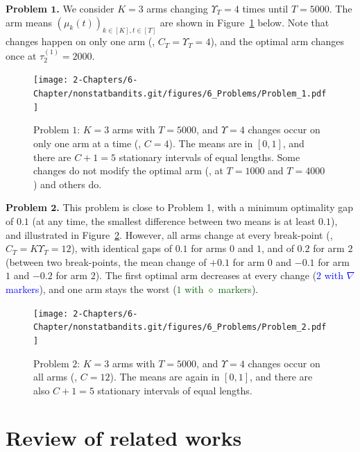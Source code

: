\textbf{Problem $\bm 1$.}
We consider $K=3$ arms changing $\Upsilon_T=4$ times until $T=5000$.
The arm means $(\mu_k(t))_{k\in[K],t\in[T]}$ are shown in Figure~\ref{fig:6:Problem_1} below.
Note that changes happen on only one arm (\ie, $C_T=\Upsilon_T=4$),
and the optimal arm changes once at $\tau_2^{(1)}=2000$.

\begin{figure}[h!]  %
    \centering
    \texttt{[image: 2-Chapters/6-Chapter/nonstatbandits.git/figures/6\_Problems/Problem\_1.pdf]}
    \caption{Problem $1$: $K=3$ arms with $T=5000$, and $\Upsilon=4$ changes occur on only one arm at a time (\ie, $C=4$).
        The means are in $[0,1]$, and there are $C+1=5$ stationary intervals of equal lengths.
        Some changes do not modify the optimal arm (\eg, at $T=1000$ and $T=4000$) and others do.
    }
    \label{fig:6:Problem_1}
\end{figure}


\textbf{Problem $\bm 2$.}
This problem is close to Problem 1, with a minimum optimality gap of $0.1$ (at any time, the smallest difference between two means is at least $0.1$),
and illustrated in Figure~\ref{fig:6:Problem_2}.
However, all arms change at every break-point (\ie, $C_T=K\Upsilon_T=12$), with identical gaps of $0.1$ for arms $0$ and $1$, and of $0.2$ for arm $2$ (between two break-points, the mean change of $+0.1$ for arm $0$ and $-0.1$ for arm $1$ and $-0.2$ for arm $2$).
The first optimal arm decreases at every change (\textcolor{blue}{$2$ with $\nabla$ markers}), and one arm stays the worst (\textcolor{darkgreen}{$1$ with $\diamond$ markers}).

\begin{figure}[h!]  %
    \centering
    \texttt{[image: 2-Chapters/6-Chapter/nonstatbandits.git/figures/6\_Problems/Problem\_2.pdf]}
    \caption{Problem $2$: $K=3$ arms with $T=5000$, and $\Upsilon=4$ changes occur on all arms (\ie, $C=12$).
        The means are again in $[0,1]$, and there are also $C+1=5$ stationary intervals of equal lengths.
    }
    \label{fig:6:Problem_2}
\end{figure}


\section{Review of related works}
\label{sec:6:relatedWork}


